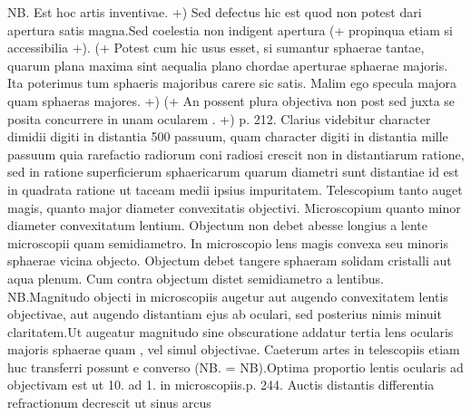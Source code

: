 NB. Est hoc artis inventivae. +) Sed defectus hic est quod non potest dari apertura satis magna.\pend \pstart Sed coelestia non indigent apertura (+ propinqua etiam si accessibilia +). (+ Potest cum hic usus esset, si sumantur sphaerae tantae, quarum plana maxima sint aequalia plano chordae aperturae sphaerae majoris. Ita poterimus tum sphaeris majoribus carere sic satis. Malim ego specula\protect{} majora quam sphaeras majores. +) (+ An possent plura objectiva\protect{} non post sed juxta se posita concurrere in unam ocularem \Denarius. +) p. 212. Clarius videbitur character dimidii digiti in distantia 500 passuum, quam character digiti in distantia mille passuum quia rarefactio radiorum coni radiosi crescit non in distantiarum ratione, sed in ratione superficierum sphaericarum quarum diametri sunt distantiae id est in quadrata ratione ut taceam medii ipsius impuritatem. \pend \pstart Telescopium\protect{} tanto auget magis, quanto major diameter convexitatis objectivi\protect{}. Microscopium\protect{} quanto minor diameter convexitatum lentium\protect{}. Objectum non debet abesse longius a lente\protect{} microscopii quam semidiametro. In microscopio\protect{} lens\protect{} magis convexa seu minoris sphaerae vicina objecto. \pend \pstart Objectum debet tangere sphaeram solidam cristalli aut aqua plenum. Cum contra objectum distet semidiametro a lentibus\protect{}. NB.\pend \pstart Magnitudo objecti in microscopiis\protect{} augetur aut augendo convexitatem lentis\protect{} objectivae, aut augendo distantiam ejus ab oculari\protect{}, sed posterius nimis minuit claritatem.\pend \pstart Ut augeatur magnitudo sine obscuratione addatur tertia lens\protect{} ocularis majoris sphaerae quam , vel simul  objectivae. Caeterum artes in telescopiis\protect{} etiam huc transferri possunt e converso (NB. = NB).\pend \pstart Optima proportio lentis\protect{} ocularis\protect{} ad objectivam est ut 10. ad 1. in micro\-scopiis\protect{}.\pend \pstart p. 244. Auctis distantis differentia refractionum\protect{} decrescit ut sinus arcus 